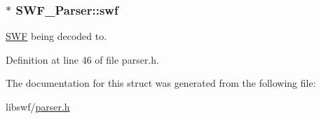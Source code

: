 \subsubsection[{swf}]{$\ast$ S\+W\+F\+\_\+\+Parser\+::swf}\label{struct_s_w_f___parser_a89022933c95956b746307de9714197da}


\hyperlink{struct_s_w_f}{S\+W\+F} being decoded to. 



Definition at line 46 of file parser.\+h.



The documentation for this struct was generated from the following file\+:\begin{DoxyCompactItemize}
\item 
libswf/\hyperlink{parser_8h}{parser.\+h}\end{DoxyCompactItemize}
